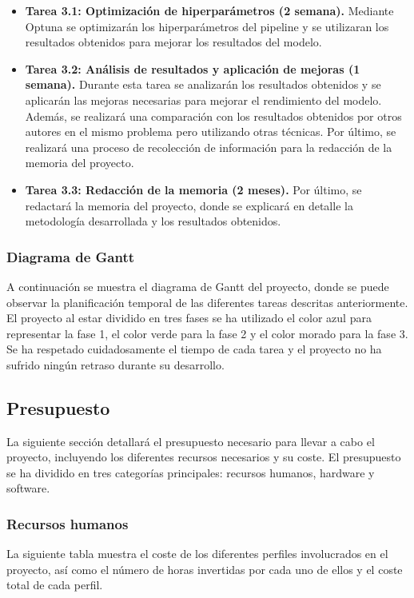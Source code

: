 \begin{itemize}
    \item \textbf{Tarea 3.1: Optimización de hiperparámetros (2 semana).} Mediante Optuna se optimizarán los
          hiperparámetros del pipeline y se utilizaran los resultados obtenidos para mejorar los resultados del
          modelo.
    \item \textbf{Tarea 3.2: Análisis de resultados y aplicación de mejoras (1 semana).} Durante esta tarea se
          analizarán los resultados obtenidos y se aplicarán las mejoras necesarias para mejorar el rendimiento del
          modelo. Además, se realizará una comparación con los resultados obtenidos por otros autores en el mismo
          problema pero utilizando otras técnicas. Por último, se realizará una proceso de recolección de información
          para la redacción de la memoria del proyecto.
    \item \textbf{Tarea 3.3: Redacción de la memoria (2 meses).} Por último, se redactará la memoria del proyecto,
          donde se explicará en detalle la metodología desarrollada y los resultados obtenidos.
\end{itemize}

\subsubsection{Diagrama de Gantt}
A continuación se muestra el diagrama de Gantt del proyecto, donde se puede
observar la planificación temporal de las diferentes tareas descritas
anteriormente. El proyecto al estar dividido en tres fases se ha utilizado el
color azul para representar la fase 1, el color verde para la fase 2 y el color
morado para la fase 3. Se ha respetado cuidadosamente el tiempo de cada tarea y
el proyecto no ha sufrido ningún retraso durante su desarrollo.

\subsection{Presupuesto}
La siguiente sección detallará el presupuesto necesario para llevar a cabo el
proyecto, incluyendo los diferentes recursos necesarios y su coste. El
presupuesto se ha dividido en tres categorías principales: recursos humanos,
hardware y software.

\subsubsection{Recursos humanos}
La siguiente tabla muestra el coste de los diferentes perfiles involucrados en
el proyecto, así como el número de horas invertidas por cada uno de ellos y el
coste total de cada perfil.

